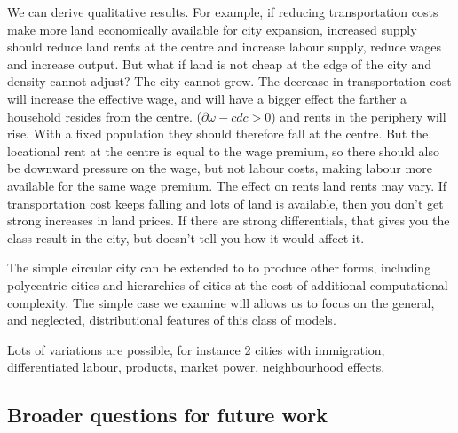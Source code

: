 We can derive qualitative results. For example, if reducing transportation costs make more land economically available for city expansion, increased supply should reduce land rents at the centre and increase labour supply, reduce wages and increase output.  But what if land is not cheap at the edge of the city and density cannot adjust? The city cannot  grow. The decrease in transportation cost will increase  the effective wage, and will have a bigger effect the farther  a household resides from the centre. ($\partial{\omega-cd}{c}>0$) and rents in the periphery will rise. With a fixed population they should therefore fall at the centre. But the locational rent at the centre is equal to the wage premium, so there should also be downward pressure on the wage, but not labour costs, making labour more available for the same wage premium. The effect on rents land rents may vary. If transportation cost keeps falling and lots of land is available, then you don't get strong increases in land prices. If there are strong differentials, that gives you the class result in the city, but doesn't tell you how it would affect it. 




The simple circular city can be extended to to produce other forms, including polycentric cities and hierarchies of cities at the cost of additional computational complexity. The simple case we examine will allows us to focus on the general, and neglected, distributional features of this class of models.


Lots of variations are possible, for instance 2 cities with immigration, differentiated labour, products, market power, neighbourhood effects. %


\subsection{Broader questions for future work}



